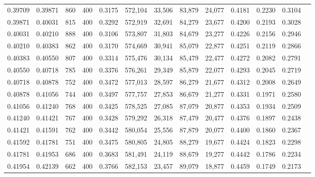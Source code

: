 \begin{tabular}{rrrrrrrrrrrrr}
0.39709 & 0.39871 &    860 & 400 &                                     0.3175 & 572,104 &  33,506 &  83,879 &  24,077 & 0.4181 & 0.2230 & 0.3104 \\
0.39871 & 0.40031 &    815 & 400 &                                     0.3292 & 572,919 &  32,691 &  84,279 &  23,677 & 0.4200 & 0.2193 & 0.3028 \\
0.40031 & 0.40210 &    888 & 400 &                                     0.3106 & 573,807 &  31,803 &  84,679 &  23,277 & 0.4226 & 0.2156 & 0.2946 \\
0.40210 & 0.40383 &    862 & 400 &                                     0.3170 & 574,669 &  30,941 &  85,079 &  22,877 & 0.4251 & 0.2119 & 0.2866 \\
0.40383 & 0.40550 &    807 & 400 &                                     0.3314 & 575,476 &  30,134 &  85,479 &  22,477 & 0.4272 & 0.2082 & 0.2791 \\
0.40550 & 0.40718 &    785 & 400 &                                     0.3376 & 576,261 &  29,349 &  85,879 &  22,077 & 0.4293 & 0.2045 & 0.2719 \\
0.40718 & 0.40878 &    752 & 400 &                                     0.3472 & 577,013 &  28,597 &  86,279 &  21,677 & 0.4312 & 0.2008 & 0.2649 \\
0.40878 & 0.41056 &    744 & 400 &                                     0.3497 & 577,757 &  27,853 &  86,679 &  21,277 & 0.4331 & 0.1971 & 0.2580 \\
0.41056 & 0.41240 &    768 & 400 &                                     0.3425 & 578,525 &  27,085 &  87,079 &  20,877 & 0.4353 & 0.1934 & 0.2509 \\
0.41240 & 0.41421 &    767 & 400 &                                     0.3428 & 579,292 &  26,318 &  87,479 &  20,477 & 0.4376 & 0.1897 & 0.2438 \\
0.41421 & 0.41591 &    762 & 400 &                                     0.3442 & 580,054 &  25,556 &  87,879 &  20,077 & 0.4400 & 0.1860 & 0.2367 \\
0.41592 & 0.41781 &    751 & 400 &                                     0.3475 & 580,805 &  24,805 &  88,279 &  19,677 & 0.4424 & 0.1823 & 0.2298 \\
0.41781 & 0.41953 &    686 & 400 &                                     0.3683 & 581,491 &  24,119 &  88,679 &  19,277 & 0.4442 & 0.1786 & 0.2234 \\
0.41954 & 0.42139 &    662 & 400 &                                     0.3766 & 582,153 &  23,457 &  89,079 &  18,877 & 0.4459 & 0.1749 & 0.2173 \\

\end{tabular}
